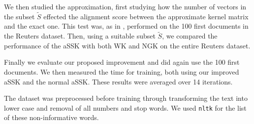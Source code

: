 We then studied the approximation, first studying how the number of vectors in the subset $ \tilde{S} $ effected the alignment score between the approximate kernel matrix and the exact one. This test was, as in \cite{lodhi}, performed on the 100 first documents in the Reuters dataset. Then, using a suitable subset $ \tilde{S} $, we compared the performance of the aSSK with both WK and NGK on the entire Reuters dataset. 

Finally we evaluate our proposed improvement and did again use the 100 first documents. We then measured the time for training, both using our improved aSSK and the normal aSSK. These results were averaged over 14 iterations.

The dataset was preprocessed before training through  transforming the text into lower case and removal of all numbers and stop words. We used \texttt{nltk} for the list of these non-informative words.


